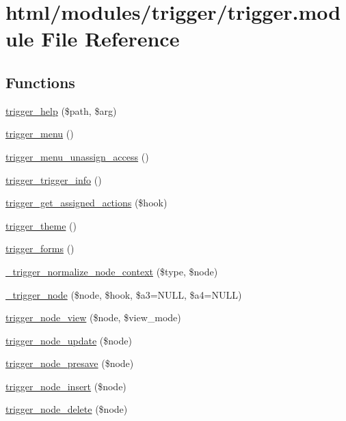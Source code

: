 \hypertarget{trigger_8module}{
\section{html/modules/trigger/trigger.module File Reference}
\label{trigger_8module}
}
\subsection*{Functions}
\begin{DoxyCompactItemize}
\item 
\hyperlink{trigger_8module_acf35c233c08343f433206af894e2e0de}{trigger\_\-help} (\$path, \$arg)
\item 
\hyperlink{trigger_8module_a467708b4dec3a4e2c9eba80d0c94db3c}{trigger\_\-menu} ()
\item 
\hyperlink{trigger_8module_a813ac3e63770c93897b3978768717a40}{trigger\_\-menu\_\-unassign\_\-access} ()
\item 
\hyperlink{trigger_8module_a3ee804634c1fcba0d2be402649b8571d}{trigger\_\-trigger\_\-info} ()
\item 
\hyperlink{trigger_8module_a1d52e4ba7b5602e21b75ebe6be90ebc3}{trigger\_\-get\_\-assigned\_\-actions} (\$hook)
\item 
\hyperlink{trigger_8module_a88e0dffc3b44efedcba25a547a629a05}{trigger\_\-theme} ()
\item 
\hyperlink{trigger_8module_abd865128c4ce28a35e58a19a9bf30fb9}{trigger\_\-forms} ()
\item 
\hyperlink{trigger_8module_a49b328cb92ac7d48d13f95946711f35f}{\_\-trigger\_\-normalize\_\-node\_\-context} (\$type, \$node)
\item 
\hyperlink{trigger_8module_a1337fc37c0ce68cd79d725179a48cba9}{\_\-trigger\_\-node} (\$node, \$hook, \$a3=NULL, \$a4=NULL)
\item 
\hyperlink{trigger_8module_acf1e3d33e0741af0dd07928dbe8b4de8}{trigger\_\-node\_\-view} (\$node, \$view\_\-mode)
\item 
\hyperlink{trigger_8module_ae3af93566b42368b4033496742b97027}{trigger\_\-node\_\-update} (\$node)
\item 
\hyperlink{trigger_8module_ab02151afb007d36dcb3ee42a28f12c40}{trigger\_\-node\_\-presave} (\$node)
\item 
\hyperlink{trigger_8module_acbb2d25f3861049eb771a7304afe724d}{trigger\_\-node\_\-insert} (\$node)
\item 
\hyperlink{trigger_8module_ab9c30dd53453d770edb48f06cc447c6b}{trigger\_\-node\_\-delete} (\$node)

\end{DoxyCompactItemize}
